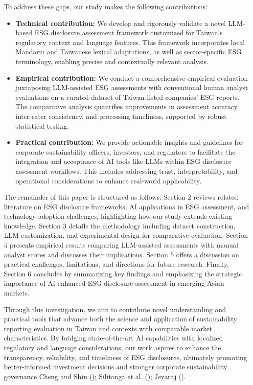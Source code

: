 \documentclass[
  12pt,
]{article}
\begin{document}
To address these gaps, our study makes the following contributions:

\begin{itemize}
\item
  \textbf{Technical contribution:} We develop and rigorously validate a
  novel LLM-based ESG disclosure assessment framework customized for
  Taiwan's regulatory context and language features. This framework
  incorporates local Mandarin and Taiwanese lexical adaptations, as well
  as sector-specific ESG terminology, enabling precise and contextually
  relevant analysis.
\item
  \textbf{Empirical contribution:} We conduct a comprehensive empirical
  evaluation juxtaposing LLM-assisted ESG assessments with conventional
  human analyst evaluations on a curated dataset of Taiwan-listed
  companies' ESG reports. The comparative analysis quantifies
  improvements in assessment accuracy, inter-rater consistency, and
  processing timeliness, supported by robust statistical testing.
\item
  \textbf{Practical contribution:} We provide actionable insights and
  guidelines for corporate sustainability officers, investors, and
  regulators to facilitate the integration and acceptance of AI tools
  like LLMs within ESG disclosure assessment workflows. This includes
  addressing trust, interpretability, and operational considerations to
  enhance real-world applicability.
\end{itemize}

The remainder of this paper is structured as follows. Section 2 reviews
related literature on ESG disclosure frameworks, AI applications in ESG
assessment, and technology adoption challenges, highlighting how our
study extends existing knowledge. Section 3 details the methodology
including dataset construction, LLM customization, and experimental
design for comparative evaluation. Section 4 presents empirical results
comparing LLM-assisted assessments with manual analyst scores and
discusses their implications. Section 5 offers a discussion on practical
challenges, limitations, and directions for future research. Finally,
Section 6 concludes by summarizing key findings and emphasizing the
strategic importance of AI-enhanced ESG disclosure assessment in
emerging Asian markets.

Through this investigation, we aim to contribute novel understanding and
practical tools that advance both the science and application of
sustainability reporting evaluation in Taiwan and contexts with
comparable market characteristics. By bridging state-of-the-art AI
capabilities with localized regulatory and language considerations, our
work aspires to enhance the transparency, reliability, and timeliness of
ESG disclosures, ultimately promoting better-informed investment
decisions and stronger corporate sustainability governance Cheng and
Shiu (); Silitonga et al.
(); Jeyaraj
().
\end{document}
